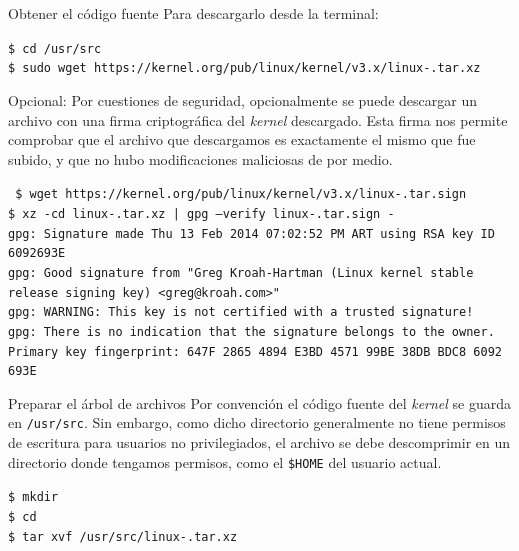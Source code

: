 \begin{frame}{Obtener el código fuente}
  Para descargarlo desde la terminal:
  \begin{block}{}
    \tiny {
    \texttt{\$ cd /usr/src}\\
    \texttt{\$ sudo wget
      https://kernel.org/pub/linux/kernel/v3.x/linux-\KERNELBASEVERSION.tar.xz} }
  \end{block}
  \vfill
  \alert{Opcional}: Por cuestiones de seguridad, opcionalmente se puede
  descargar un archivo con una firma criptográfica del \textit{kernel}
  descargado. Esta firma nos permite comprobar que el archivo que
  descargamos es exactamente el mismo que fue subido, y que no hubo
  modificaciones maliciosas de por medio.
  \begin{block}{}
    \tiny{\texttt{%
\$ wget https://kernel.org/pub/linux/kernel/v3.x/linux-\KERNELBASEVERSION.tar.sign \\
\$ xz -cd linux-\KERNELBASEVERSION.tar.xz | gpg --verify linux-\KERNELBASEVERSION.tar.sign -\\
gpg: Signature made Thu 13 Feb 2014 07:02:52 PM ART using RSA key ID 6092693E\\
gpg: Good signature from "Greg Kroah-Hartman (Linux kernel stable release signing key) <greg@kroah.com>"\\
gpg: WARNING: This key is not certified with a trusted signature!\\
gpg:          There is no indication that the signature belongs to the owner.\\
Primary key fingerprint: 647F 2865 4894 E3BD 4571  99BE 38DB BDC8 6092 693E}}
\end{block}
    
\end{frame}

\begin{frame}{Preparar el árbol de archivos}
  Por convención el código fuente del \textit{kernel} se guarda en
  \texttt{/usr/src}. Sin embargo, como dicho directorio generalmente no
  tiene permisos de escritura para usuarios no privilegiados, el archivo se
  debe descomprimir en un directorio donde tengamos permisos, como el
  \texttt{\$HOME} del usuario actual.
  
  { \small
  \begin{block}{}
    \texttt{\$ mkdir \KERNELSOURCEPATH}\\
    \texttt{\$ cd \KERNELSOURCEPATH}\\
    \texttt{\$ tar xvf /usr/src/linux-\KERNELBASEVERSION.tar.xz}
  \end{block}}
\end{frame}

